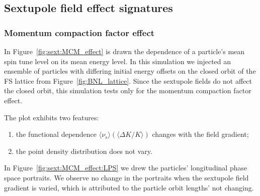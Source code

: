 \documentclass[]{elsarticle}
\newcommand{\D}{\Delta}
\newcommand{\avg}[1]{\langle{#1}\rangle}
\begin{document}
\subsection{Sextupole field effect signatures}
\subsubsection{Momentum compaction factor effect}

In Figure~\ref{fig:sext:MCM_effect} is drawn the dependence of a particle's mean spin tune level
on its mean energy level. In this simulation we injected an ensemble of particles with differing
initial energy offsets on the closed orbit of the FS lattice from Figure~\ref{fig:BNL_lattice}.
Since the sextupole fields do not affect the closed orbit, this simulation tests only for the
momentum compaction factor effect. 

The plot exhibits two features:
\begin{enumerate}[(1)]
\item the functional dependence $\avg{\nu_s}(\avg{\D K/K})$ changes with the field gradient;
  \item the point density distribution does not vary.
\end{enumerate}

In Figure~\ref{fig:sext:MCM_effect:LPS} we drew the particles' longitudinal phase space portraits.
We observe no change in the portraits when the sextupole field gradient is varied,
which is attributed to the particle orbit lengths' not changing.
\end{document}
